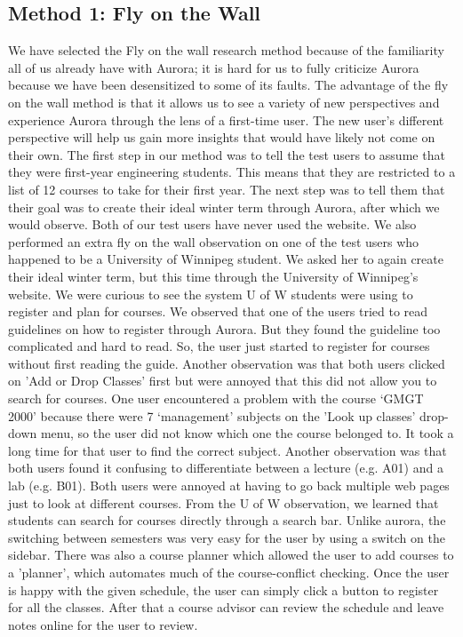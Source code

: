 \documentclass{article}
\begin{document}
\subsection{Method 1: Fly on the Wall}
We have selected the Fly on the wall research method because of the familiarity all of us already have with Aurora; it is hard for us to fully criticize Aurora because we have been desensitized to some of its faults. The advantage of the fly on the wall method is that it allows us to see a variety of new perspectives and experience Aurora through the lens of a first-time user. The new user's different perspective will help us gain more insights that would have likely not come on their own. The first step in our method was to tell the test users to assume that they were first-year engineering students. This means that they are restricted to a list of 12 courses to take for their first year. The next step was to tell them that their goal was to create their ideal winter term through Aurora, after which we would observe. Both of our test users have never used the website. We also performed an extra fly on the wall observation on one of the test users who happened to be a University of Winnipeg student. We asked her to again create their ideal winter term, but this time through the University of Winnipeg's website. We were curious to see the system U of W students were using to register and plan for courses.\newline
\newline
We observed that one of the users tried to read guidelines on how to register through Aurora. But they found the guideline too complicated and hard to read. So, the user just started to register for courses without first reading the guide. Another observation was that both users clicked on 'Add or Drop Classes' first but were annoyed that this did not allow you to search for courses. One user encountered a problem with the course ‘GMGT 2000’ because there were 7 ‘management’ subjects on the 'Look up classes' drop-down menu, so the user did not know which one the course belonged to. It took a long time for that user to find the correct subject. Another observation was that both users found it confusing to differentiate between a lecture (e.g. A01) and a lab (e.g. B01).  Both users were annoyed at having to go back multiple web pages just to look at different courses.\newline
\newline
From the U of W observation, we learned that students can search for courses directly through a search bar. Unlike aurora, the switching between semesters was very easy for the user by using a switch on the sidebar. There was also a course planner which allowed the user to add courses to a 'planner', which automates much of the course-conflict checking. Once the user is happy with the given schedule, the user can simply click a button to register for all the classes. After that a course advisor can review the schedule and leave notes online for the user to review. 
 
\end{document}
